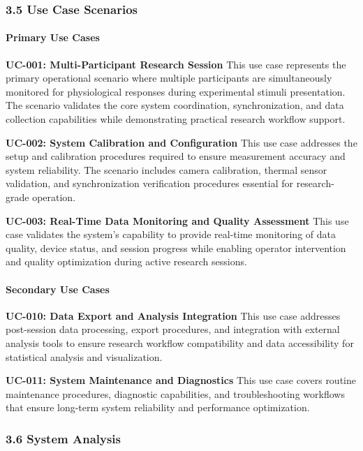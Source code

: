 \documentclass[12pt,a4paper]{report}
\begin{document}
\subsubsection{3.5 Use Case Scenarios}

\paragraph{Primary Use Cases}

\textbf{UC-001: Multi-Participant Research Session}
This use case represents the primary operational scenario where multiple participants are simultaneously monitored for
physiological responses during experimental stimuli presentation. The scenario validates the core system coordination,
synchronization, and data collection capabilities while demonstrating practical research workflow support.

\textbf{UC-002: System Calibration and Configuration}
This use case addresses the setup and calibration procedures required to ensure measurement accuracy and system
reliability. The scenario includes camera calibration, thermal sensor validation, and synchronization verification
procedures essential for research-grade operation.

\textbf{UC-003: Real-Time Data Monitoring and Quality Assessment}
This use case validates the system's capability to provide real-time monitoring of data quality, device status, and
session progress while enabling operator intervention and quality optimization during active research sessions.

\paragraph{Secondary Use Cases}

\textbf{UC-010: Data Export and Analysis Integration}
This use case addresses post-session data processing, export procedures, and integration with external analysis tools to
ensure research workflow compatibility and data accessibility for statistical analysis and visualization.

\textbf{UC-011: System Maintenance and Diagnostics}
This use case covers routine maintenance procedures, diagnostic capabilities, and troubleshooting workflows that ensure
long-term system reliability and performance optimization.

\subsubsection{3.6 System Analysis}
\end{document}

